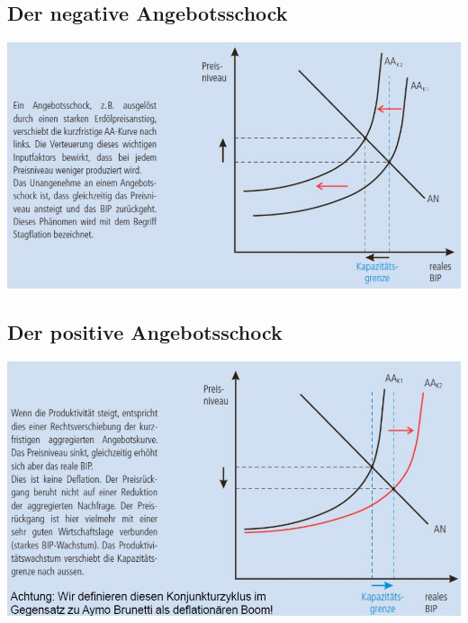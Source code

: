 \begin{multicols}{2}
\subsection{Der negative Angebotsschock}
\includegraphics[width=0.98\linewidth]{images/negangebot.jpg}
\subsection{Der positive Angebotsschock}
\includegraphics[width=0.98\linewidth]{images/posangebot.jpg}
\end{multicols}
